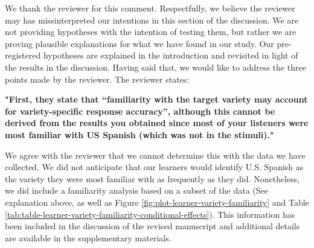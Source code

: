 \documentclass[]{article}
\begin{document}

We thank the reviewer for this comment.
Respectfully, we believe the reviewer may has missinterpreted our intentions in this section of the discussion.
We are not providing hypotheses with the intention of testing them, but rather we are proving plausible explanations for what we have found in our study.
Our pre-registered hypotheses are explained in the introduction and revisited in light of the results in the discussion.
Having said that, we would like to address the three points made by the reviewer.
The reviewer states:

\textbf{"First, they state that “familiarity with the target variety may account for variety-specific response accuracy”, although this cannot be derived from the results you obtained since most of your listeners were most familiar with US Spanish (which was not in the stimuli)."}

We agree with the reviewer that we cannot determine this with the data we have collected.
We did not anticipate that our learners would identify U.S. Spanish as the variety they were most familiar with as frequently as they did.
Nonetheless, we did include a familiarity analysis based on a subset of the data (See explanation above, as well as Figure \ref{fig:plot-learner-variety-familiarity} and Table \ref{tab:table-learner-variety-familiarity-conditional-effects}).
This information has been included in the discussion of the revised manuscript and additional details are available in the supplementary materials.
\end{document}
